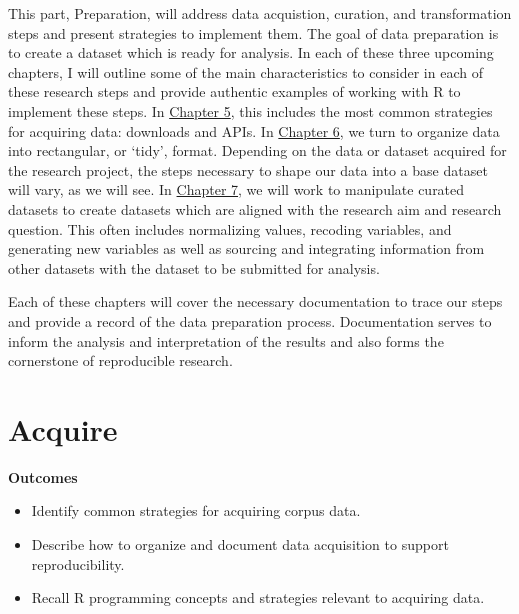 \documentclass[
  letterpaper,
  krantz1]{latex/krantz-mod}
\providecommand{\tightlist}{%
  \setlength{\itemsep}{0pt}\setlength{\parskip}{0pt}}\usepackage{longtable,booktabs,array}
\newcommand{\setDOI}[1]{%
  \gdef\doi{%
    \footnotesize%
    #1\par%
    This chapter has been made available under a CC-BY-NC-ND license.%
  }%
}
\theoremstyle{definition}
\theoremstyle{definition}
\theoremstyle{remark}
\begin{document}
This part, Preparation, will address data acquistion, curation, and
transformation steps and present strategies to implement them. The goal
of data preparation is to create a dataset which is ready for analysis.
In each of these three upcoming chapters, I will outline some of the
main characteristics to consider in each of these research steps and
provide authentic examples of working with R to implement these steps.
In \hyperref[sec-acquire-chapter]{Chapter 5}, this includes the most
common strategies for acquiring data: downloads and APIs. In
\hyperref[sec-curate-data]{Chapter 6}, we turn to organize data into
rectangular, or `tidy', format. Depending on the data or dataset
acquired for the research project, the steps necessary to shape our data
into a base dataset will vary, as we will see. In
\hyperref[sec-transform-data]{Chapter 7}, we will work to manipulate
curated datasets to create datasets which are aligned with the research
aim and research question. This often includes normalizing values,
recoding variables, and generating new variables as well as sourcing and
integrating information from other datasets with the dataset to be
submitted for analysis.

Each of these chapters will cover the necessary documentation to trace
our steps and provide a record of the data preparation process.
Documentation serves to inform the analysis and interpretation of the
results and also forms the cornerstone of reproducible research.

\chapter{Acquire}\label{sec-acquire-chapter}

\setDOI{10.4324/9781003393764.5}
\thispagestyle{chapterfirstpage}

\begin{tcolorbox}[enhanced jigsaw, toprule=.15mm, breakable, colback=white, arc=.35mm, left=2mm, colframe=quarto-callout-color-frame, opacityback=0, bottomrule=.15mm, rightrule=.15mm, leftrule=.75mm]

\textbf{ Outcomes}

\begin{itemize}
\tightlist
\item
  Identify common strategies for acquiring corpus data.
\item
  Describe how to organize and document data acquisition to support
  reproducibility.
\item
  Recall R programming concepts and strategies relevant to acquiring
  data.
\end{itemize}

\end{tcolorbox}
\end{document}
